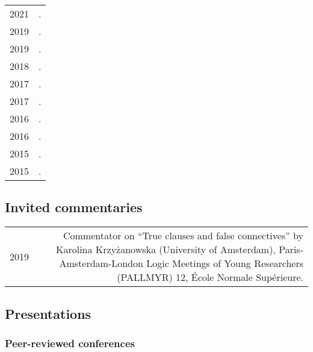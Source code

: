 \documentclass[12pt,letterpaper,twoside]{article}
\makeatletter
\newenvironment{cvsection}{%
  \setlength{\extrarowheight}{0.70ex}
  \begin{longtable}[l]{@{} L R @{}}
}{%
  \end{longtable}
}
\makeatother
\begin{document}
\begin{cvsection}
  2021 & .\\
  2019 & .\\
  2019 & .\\
  2018 & .\\
  2017 & .\\
  2017 & .\\
  2016 & .\\
  2016 & .\\
  2015 & .\\
  2015 & .\\
\end{cvsection}

\subsection*{Invited commentaries}

\begin{cvsection}
  2019 & Commentator on ``True clauses and false connectives'' by Karolina Krzyżanowska (University of Amsterdam), Paris-Amsterdam-London Logic Meetings of Young Researchers (PALLMYR) 12, École Normale Supérieure.\\
\end{cvsection}

\subsection*{Presentations}

\subsubsection*{Peer-reviewed conferences}
\end{document}
